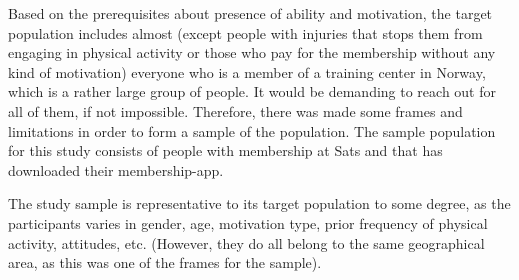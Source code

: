 
Based on the prerequisites about presence of ability and motivation, the target population includes almost (except people with injuries that stops them from engaging in physical activity or those who pay for the membership without any kind of motivation) everyone who is a member of a training center in Norway, which is a rather large group of people. It would be demanding to reach out for all of them, if not impossible. Therefore, there was made some frames and limitations in order to form a sample of the population. The sample population for this study consists of people with membership at Sats and that has downloaded their membership-app. 
 
The study sample is representative to its target population to some degree, as the participants varies in gender, age, motivation type, prior frequency of physical activity, attitudes, etc. (However, they do all belong to the same geographical area, as this was one of the frames for the sample).




